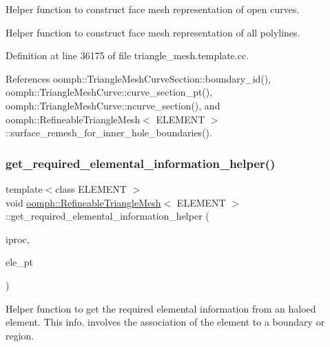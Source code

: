 Helper function to construct face mesh representation of open curves. 

Helper function to construct face mesh representation of all polylines. 

Definition at line 36175 of file triangle\+\_\+mesh.\+template.\+cc.



References oomph\+::\+Triangle\+Mesh\+Curve\+Section\+::boundary\+\_\+id(), oomph\+::\+Triangle\+Mesh\+Curve\+::curve\+\_\+section\+\_\+pt(), oomph\+::\+Triangle\+Mesh\+Curve\+::ncurve\+\_\+section(), and oomph\+::\+Refineable\+Triangle\+Mesh$<$ E\+L\+E\+M\+E\+N\+T $>$\+::surface\+\_\+remesh\+\_\+for\+\_\+inner\+\_\+hole\+\_\+boundaries().

\mbox{\label{classoomph_1_1RefineableTriangleMesh_a3aa0f6e9e28b77d42505e24b3d68af8a}} 
\subsubsection{\texorpdfstring{get\+\_\+required\+\_\+elemental\+\_\+information\+\_\+helper()}{get\_required\_elemental\_information\_helper()}}
{\footnotesize\ttfamily template$<$class E\+L\+E\+M\+E\+NT $>$ \\
void \hyperlink{classoomph_1_1RefineableTriangleMesh}{oomph\+::\+Refineable\+Triangle\+Mesh}$<$ E\+L\+E\+M\+E\+NT $>$\+::get\+\_\+required\+\_\+elemental\+\_\+information\+\_\+helper (\begin{DoxyParamCaption}\item[{unsigned \&}]{iproc,  }\item[{\hyperlink{classoomph_1_1FiniteElement}{Finite\+Element} $\ast$}]{ele\+\_\+pt }\end{DoxyParamCaption})\hspace{0.3cm}{\ttfamily [protected]}}



Helper function to get the required elemental information from an haloed element. This info. involves the association of the element to a boundary or region. 



